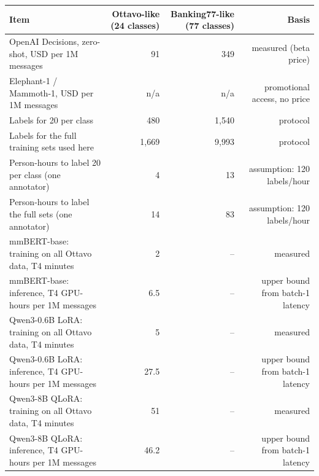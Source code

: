 \begin{tabular}{lrrr}
\toprule
Item & Ottavo-like (24 classes) & Banking77-like (77 classes) & Basis \\
\midrule
OpenAI Decisions{,} zero-shot{,} USD per 1M messages & 91 & 349 & measured (beta price) \\
Elephant-1 / Mammoth-1{,} USD per 1M messages & n/a & n/a & promotional access{,} no price \\
Labels for 20 per class & 480 & 1{,}540 & protocol \\
Labels for the full training sets used here & 1{,}669 & 9{,}993 & protocol \\
Person-hours to label 20 per class (one annotator) & 4 & 13 & assumption: 120 labels/hour \\
Person-hours to label the full sets (one annotator) & 14 & 83 & assumption: 120 labels/hour \\
mmBERT-base: training on all Ottavo data{,} T4 minutes & 2 & -- & measured \\
mmBERT-base: inference{,} T4 GPU-hours per 1M messages & 6.5 & -- & upper bound from batch-1 latency \\
Qwen3-0.6B LoRA: training on all Ottavo data{,} T4 minutes & 5 & -- & measured \\
Qwen3-0.6B LoRA: inference{,} T4 GPU-hours per 1M messages & 27.5 & -- & upper bound from batch-1 latency \\
Qwen3-8B QLoRA: training on all Ottavo data{,} T4 minutes & 51 & -- & measured \\
Qwen3-8B QLoRA: inference{,} T4 GPU-hours per 1M messages & 46.2 & -- & upper bound from batch-1 latency \\
\bottomrule
\end{tabular}